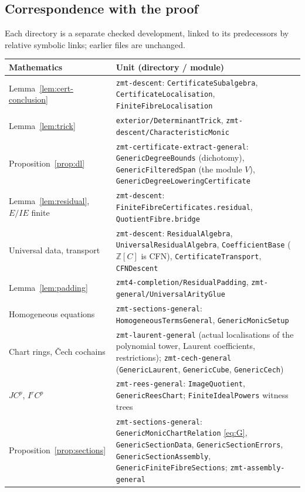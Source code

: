 \documentclass[11pt]{amsart}
\numberwithin{equation}{section}
\theoremstyle{definition}
\theoremstyle{remark}
\newcommand{\code}[1]{\texttt{#1}}
\newcommand{\ZZ}{\mathbb Z}
\begin{document}
\subsection{Correspondence with the proof}
Each directory is a separate checked development, linked to its
predecessors by relative symbolic links; earlier files are unchanged.

{\small\begin{longtable}{>{\raggedright\arraybackslash}p{}>{\raggedright\arraybackslash}p{}}
\toprule
Mathematics & Unit (directory / module) \\
\midrule
\endhead
Lemma~\ref{lem:cert-conclusion} & \code{zmt-descent}: \code{CertificateSubalgebra},
 \code{CertificateLocalisation}, \code{FiniteFibreLocalisation}\\
Lemma~\ref{lem:trick} & \code{exterior/DeterminantTrick},
 \code{zmt-descent/CharacteristicMonic}\\
Proposition~\ref{prop:dl} & \code{zmt-certificate-extract-general}:
 \code{GenericDegreeBounds} (dichotomy), \code{GenericFilteredSpan}
 (the module $V$), \code{GenericDegreeLoweringCertificate}\\
Lemma~\ref{lem:residual}, $E/IE$ finite & \code{zmt-descent}:
 \code{FiniteFibreCertificates.residual}, \code{QuotientFibre.bridge}\\
Universal data, transport & \code{zmt-descent}: \code{ResidualAlgebra},
 \code{UniversalResidualAlgebra}, \code{CoefficientBase} ($\ZZ[C]$ is CFN),
 \code{CertificateTransport}, \code{CFNDescent}\\
Lemma~\ref{lem:padding} & \code{zmt4-completion/ResidualPadding},
 \code{zmt-general/UniversalArityGlue}\\
Homogeneous equations & \code{zmt-sections-general}: \code{HomogeneousTermsGeneral},
 \code{GenericMonicSetup}\\
Chart rings, \v Cech cochains & \code{zmt-laurent-general} (actual localisations
 of the polynomial tower, Laurent coefficients, restrictions);
 \code{zmt-cech-general} (\code{GenericLaurent}, \code{GenericCube},
 \code{GenericCech})\\
$JC^p$, $I^rC^p$ & \code{zmt-rees-general}: \code{ImageQuotient},
 \code{GenericReesChart}; \code{FiniteIdealPowers} witness trees\\
Proposition~\ref{prop:sections} & \code{zmt-sections-general}:
 \code{GenericMonicChartRelation} \eqref{eq:G}, \code{GenericSectionData},
 \code{GenericSectionErrors}, \code{GenericSectionAssembly},
 \code{GenericFiniteFibreSections}; \code{zmt-assembly-general}\\

\end{longtable}}
\end{document}
